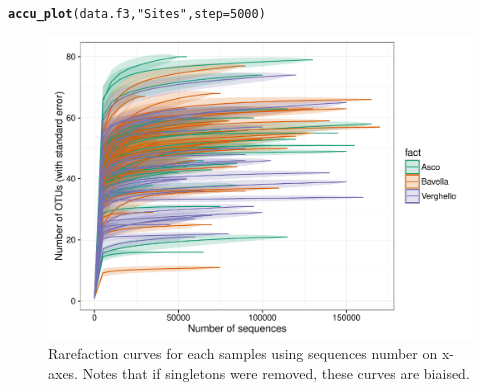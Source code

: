 \documentclass[12pt]{article}\usepackage[]{graphicx}\usepackage[]{color}
\makeatletter
\def\maxwidth{ %
  \ifdim\Gin@nat@width>\linewidth
    \linewidth
  \else
    \Gin@nat@width
  \fi
}
\newcommand{\hlnum}[1]{\textcolor[rgb]{0.686,0.059,0.569}{#1}}%
\newcommand{\hlstr}[1]{\textcolor[rgb]{0.192,0.494,0.8}{#1}}%
\newcommand{\hlstd}[1]{\textcolor[rgb]{0.345,0.345,0.345}{#1}}%
\newcommand{\hlkwc}[1]{\textcolor[rgb]{0.333,0.667,0.333}{#1}}%
\newcommand{\hlkwd}[1]{\textcolor[rgb]{0.737,0.353,0.396}{\textbf{#1}}}%
\newenvironment{kframe}{%
 \def\at@end@of@kframe{}%
 \ifinner\ifhmode%
  \def\at@end@of@kframe{\end{minipage}}%
  \begin{minipage}{\columnwidth}%
 \fi\fi%
 \def\FrameCommand##1{\hskip\@totalleftmargin \hskip-\fboxsep
 \colorbox{shadecolor}{##1}\hskip-\fboxsep
     \hskip-\linewidth \hskip-\@totalleftmargin \hskip\columnwidth}%
 \MakeFramed {\advance\hsize-\width
   \@totalleftmargin\z@ \linewidth\hsize
   \@setminipage}}%
 {\par\unskip\endMakeFramed%
 \at@end@of@kframe}
\newenvironment{knitrout}{}{} %
\numberwithin{figure}{section}
\makeatother
\begin{document}
\begin{knitrout}\small
{}\color{fgcolor}\begin{kframe}
\begin{alltt}
\hlkwd{accu_plot}\hlstd{(data.f3,} \hlstr{"Sites"}\hlstd{,} \hlkwc{step} \hlstd{=} \hlnum{5000}\hlstd{)}
\end{alltt}
\end{kframe}\begin{figure}

{\centering \includegraphics[width=\maxwidth]{figure/unnamed-chunk-36-1} 

}

\caption[Rarefaction curves for each samples using sequences number on x-axes]{Rarefaction curves for each samples using sequences number on x-axes. Notes that if singletons were removed, these curves are biaised.}\label{fig:unnamed-chunk-36}
\end{figure}


\end{knitrout}
\end{document}
